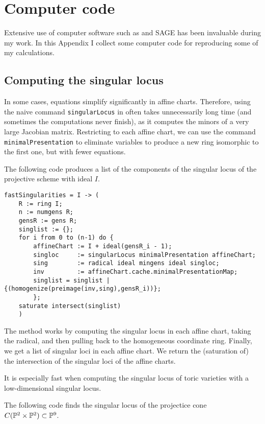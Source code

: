 \chapter{Computer code}
\label{sec:computercode}

Extensive use of computer software such as \MM \cite{M2} and SAGE \cite{sagemath} has been invaluable during my work. In this Appendix I collect some computer code for reproducing some of my calculations.

\section{Computing the singular locus}

In some cases, equations simplify significantly in affine charts. Therefore, using the naive command \texttt{singularLocus} in \MM often takes unnecessarily long time (and sometimes the computations never finish), as it computes the minors of a very large Jacobian matrix. Restricting to each affine chart, we can use the command \texttt{minimalPresentation} to eliminate variables to produce a new ring isomorphic to the first one, but with fewer equations.

The following code produces a list of the components of the singular locus of the projective scheme with ideal $I$.

\begin{lstlisting}[language=Macaulay2]
fastSingularities = I -> (
    R := ring I;
    n := numgens R;
    gensR := gens R;
    singlist := {};
    for i from 0 to (n-1) do {
        affineChart := I + ideal(gensR_i - 1);
        singloc     := singularLocus minimalPresentation affineChart;
        sing        := radical ideal mingens ideal singloc;
        inv         := affineChart.cache.minimalPresentationMap;
        singlist = singlist | {(homogenize(preimage(inv,sing),gensR_i))};
        };
    saturate intersect(singlist)
    )
\end{lstlisting}

The method works by computing the singular locus in each affine chart, taking the radical, and then pulling back to the homogeneous coordinate ring. Finally, we get a list of singular loci in each affine chart. We return the (saturation of) the intersection of the singular loci of the affine charts.

It is especially fast when computing the singular locus of toric varieties with a low-dimensional singular locus.

The following code finds the singular locus of the projectice cone $C(\P^2 \times \P^2) \subset \P^9$.


